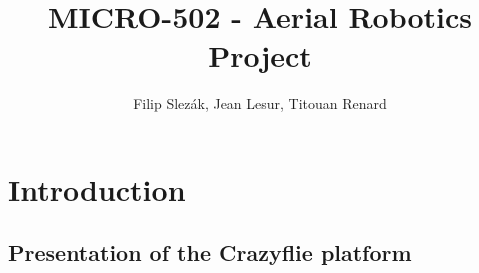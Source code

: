 \documentclass[11pt]{article}
\title{MICRO-502 - Aerial Robotics Project}
\author{Filip Slezák, Jean Lesur, Titouan Renard}
\begin{document}
\maketitle

\section{Introduction}

\subsection{Presentation of the Crazyflie platform}

\cite{salamadra_robotica_2}

\tableofcontents

\printbibliography %
\end{document}
